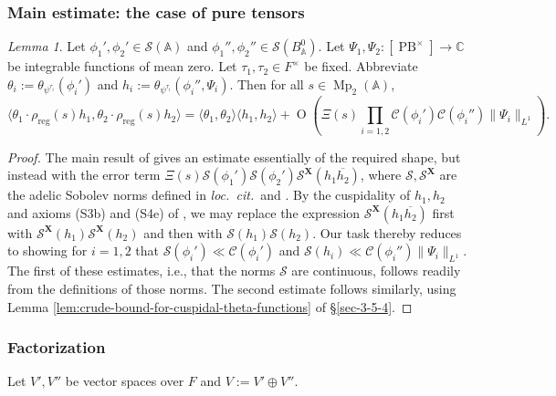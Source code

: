 \documentclass[reqno,10pt]{amsart}
\theoremstyle{plain} %
\theoremstyle{definition}
\theoremstyle{plain} %
\theoremstyle{remark}
\theoremstyle{itplain} %
\newtheorem*{lemma*}{Lemma}
\theoremstyle{remark} %
\numberwithin{equation}{section}
\DeclareMathOperator{\Mp}{Mp}
\def\PB{\operatorname{PB}}
\def\O{\operatorname{O}}
\DeclareMathOperator{\reg}{reg}
\begin{document}
\subsubsection{Main estimate: the case of pure tensors}
\label{sec-3-5-3}
\begin{lemma*}\label{lem:main-result-for-theta-squared}
  Let $\phi_1', \phi_2' \in \mathcal{S}(\mathbb{A})$ and $\phi_1'', \phi_2'' \in \mathcal{S}(B_\mathbb{A}^0)$.  Let $\Psi_1, \Psi_2 : [\PB^\times] \rightarrow \mathbb{C}$ be integrable functions of mean zero.  Let $\tau_1, \tau_2 \in F^\times$ be fixed.  Abbreviate $\theta_i := \theta_{\psi^{\tau_i}}(\phi_i')$ and $h_i := \theta_{\psi^{\tau_i}}(\phi_i'',\Psi_i)$.  Then for all $s \in \Mp_2(\mathbb{A})$,
  \[
    \langle \theta_1 \cdot \rho_{\reg}(s) h_1, \theta_2 \cdot \rho_{\reg}(s) h_2 \rangle = \langle \theta_1, \theta_2 \rangle \langle h_1, h_2 \rangle + \O\left(\Xi(s) \prod_{i=1,2} \mathcal{C}(\phi_i') \mathcal{C}(\phi_i'') \|\Psi_i\|_{L^1} \right).
  \]
\end{lemma*}
\begin{proof}
  The main result of \cite{nelson-theta-squared} gives an estimate essentially of the required shape, but instead with the error term $\Xi(s) \mathcal{S}(\phi_1') \mathcal{S}(\phi_2') \mathcal{S}^{\mathbf{X}}(h_1 \overline{h_2})$, where $\mathcal{S}, \mathcal{S}^{\mathbf{X}}$ are the adelic Sobolev norms defined in \emph{loc.\ cit.}\ and \cite[\S2]{michel-2009}.  By the cuspidality of $h_1, h_2$ and axioms (S3b) and (S4e) of \cite{michel-2009}, we may replace the expression $\mathcal{S}^{\mathbf{X}}(h_1 \overline{h_2})$ first with $\mathcal{S}^{\mathbf{X}}(h_1) \mathcal{S}^{\mathbf{X}}(h_2)$ and then with $\mathcal{S}(h_1) \mathcal{S}(h_2)$.  Our task thereby reduces to showing for $i=1,2$ that $\mathcal{S}(\phi_i') \ll \mathcal{C}(\phi_i')$ and $\mathcal{S}(h_i) \ll \mathcal{C}(\phi_i'') \|\Psi_i\|_{L^1}$.  The first of these estimates, i.e., that the norms $\mathcal{S}$ are continuous, follows readily from the definitions of those norms.  The second estimate follows similarly, using Lemma \ref{lem:crude-bound-for-cuspidal-theta-functions} of \S\ref{sec-3-5-4}.
\end{proof}







\subsubsection{Factorization}\label{sec:quantitative-factorization}
Let $V', V''$ be vector spaces over $F$ and $V := V' \oplus V''$.
\end{document}
